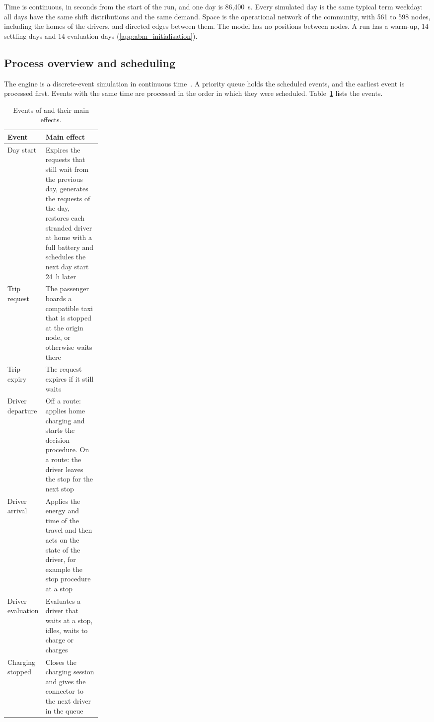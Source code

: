 Time is continuous, in seconds from the start of the run, and one day is 86,400~s. Every simulated day is the same typical term weekday: all days have the same shift distributions and the same demand. Space is the operational network of the community, with 561 to 598 nodes, including the homes of the drivers, and directed edges between them. The model has no positions between nodes. A run has a warm-up, 14 settling days and 14 evaluation days (\ref{app:abm_initialisation}).

\subsection{Process overview and scheduling}
\label{app:abm_process}

The engine is a discrete-event simulation in continuous time~\cite{law2015_simulation_modeling_and_analysis}. A priority queue holds the scheduled events, and the earliest event is processed first. Events with the same time are processed in the order in which they were scheduled. Table~\ref{tab:abm_events} lists the events.

\begin{table}[htbp]
    \centering
    \footnotesize
    \caption[Events of \MA{} and their main effects]{Events of \MA{} and their main effects.}
    \label{tab:abm_events}
    \begin{tabularx}{\linewidth}{@{}>{\raggedright\arraybackslash}p{0.22\linewidth}X@{}}
        \toprule
        \textbf{Event} & \textbf{Main effect} \\
        \midrule
        Day start & Expires the requests that still wait from the previous day, generates the requests of the day, restores each stranded driver at home with a full battery and schedules the next day start 24~h later \\
        Trip request & The passenger boards a compatible taxi that is stopped at the origin node, or otherwise waits there \\
        Trip expiry & The request expires if it still waits \\
        Driver departure & Off a route: applies home charging and starts the decision procedure. On a route: the driver leaves the stop for the next stop \\
        Driver arrival & Applies the energy and time of the travel and then acts on the state of the driver, for example the stop procedure at a stop \\
        Driver evaluation & Evaluates a driver that waits at a stop, idles, waits to charge or charges \\
        Charging stopped & Closes the charging session and gives the connector to the next driver in the queue \\
        \bottomrule
    \end{tabularx}
\end{table}

